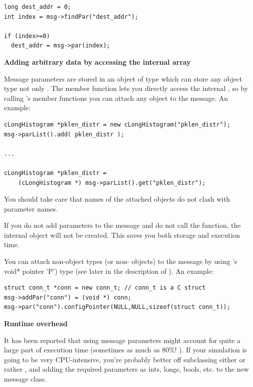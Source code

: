 \begin{Verbatim}
long dest_addr = 0;
int index = msg->findPar("dest_addr");

if (index>=0)
  dest_addr = msg->par(index);
\end{Verbatim}

\textbf{Adding arbitrary data by accessing the internal array}


Message parameters are stored in an object of type 
which can store any object type not only
. The 
member function lets you directly access the internal ,
so by calling 's member functions you can attach any
object to the message. An example:

\begin{Verbatim}
cLongHistogram *pklen_distr = new cLongHistogram("pklen_distr");
msg->parList().add( pklen_distr );

...

cLongHistogram *pklen_distr =
    (cLongHistogram *) msg->parList().get("pklen_distr");
\end{Verbatim}


You should take care that names of the attached objects do not 
clash with parameter names.

If you do not add parameters to the message and do not call the  
function, the internal  object will not be created. This 
saves you both storage and execution time.

You can attach non-object types (or non- objects) to
the message by using
's void* pointer 'P') type (see later in the description
of ). An example:

\begin{Verbatim}
struct conn_t *conn = new conn_t; // conn_t is a C struct
msg->addPar("conn") = (void *) conn;
msg->par("conn").configPointer(NULL,NULL,sizeof(struct conn_t));
\end{Verbatim}


\textbf{Runtime overhead}


It has been reported that using  message parameters might
account for quite a large part of execution time (sometimes as much as
80\%! ). If your simulation is going to be very CPU-intensive, you're
probably better off subclassing either
 or rather , and adding the required
parameters as ints, longs, bools, etc.  to the new message class.


